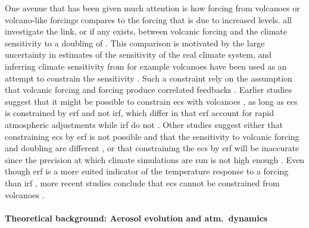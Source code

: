 \documentclass{ametsocV5}
\begin{document}
One avenue that has been given much attention is how forcing from volcanoes or
volcano-like forcings compares to the forcing that is due to increased  levels.
\citet{boer2007,marvel2016,merlis2014,ollila2016,richardson2019,salvi2022,wigley2005}
all investigate the link, or if any exists, between volcanic forcing and the climate
sensitivity to a doubling of . This comparison is motivated by the large
uncertainty in estimates of the sensitivity of the real climate system, and inferring
climate sensitivity from for example volcanoes have been used as an attempt to constrain
the sensitivity \citep{boer2007}. Such a constraint rely on the assumption that volcanic
forcing and  forcing produce correlated feedbacks \citep{pauling2023}.
Earlier studies suggest that it might be possible to constrain \ac{ecs} with volcanoes
\citep{bender2010}, as long as \ac{ecs} is constrained by \ac{erf} and not \ac{irf},
which differ in that \ac{erf} account for rapid atmospheric adjustments while \ac{irf}
do not \citep{richardson2019}. Other studies suggest either that constraining \ac{ecs}
by \ac{erf} is not possible and that the sensitivity to volcanic forcing and 
doubling are different \citep{douglass2006}, or that constraining the \ac{ecs} by
\ac{erf} will be inaccurate since the precision at which climate simulations are run is
not high enough \citep{boer2007,salvi2022}. Even though \ac{erf} is a more suited
indicator of the temperature response to a forcing than \ac{irf}
\citep{marvel2016,richardson2019}, more recent studies conclude that \ac{ecs} cannot be
constrained from volcanoes \citep{pauling2023}.

\paragraph*{Theoretical background: Aerosol evolution and atm.\ dynamics}
\end{document}
